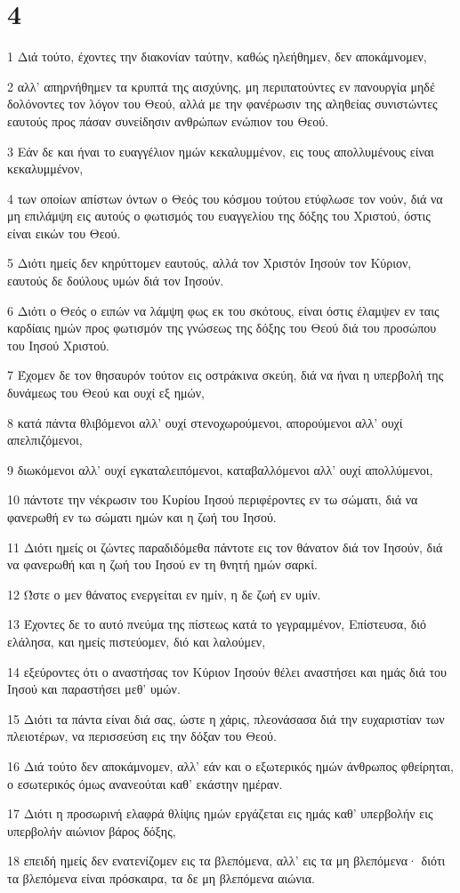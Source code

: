 \chapter{4}

\par 1 Διά τούτο, έχοντες την διακονίαν ταύτην, καθώς ηλεήθημεν, δεν αποκάμνομεν,
\par 2 αλλ' απηρνήθημεν τα κρυπτά της αισχύνης, μη περιπατούντες εν πανουργία μηδέ δολόνοντες τον λόγον του Θεού, αλλά με την φανέρωσιν της αληθείας συνιστώντες εαυτούς προς πάσαν συνείδησιν ανθρώπων ενώπιον του Θεού.
\par 3 Εάν δε και ήναι το ευαγγέλιον ημών κεκαλυμμένον, εις τους απολλυμένους είναι κεκαλυμμένον,
\par 4 των οποίων απίστων όντων ο Θεός του κόσμου τούτου ετύφλωσε τον νούν, διά να μη επιλάμψη εις αυτούς ο φωτισμός του ευαγγελίου της δόξης του Χριστού, όστις είναι εικών του Θεού.
\par 5 Διότι ημείς δεν κηρύττομεν εαυτούς, αλλά τον Χριστόν Ιησούν τον Κύριον, εαυτούς δε δούλους υμών διά τον Ιησούν.
\par 6 Διότι ο Θεός ο ειπών να λάμψη φως εκ του σκότους, είναι όστις έλαμψεν εν ταις καρδίαις ημών προς φωτισμόν της γνώσεως της δόξης του Θεού διά του προσώπου του Ιησού Χριστού.
\par 7 Έχομεν δε τον θησαυρόν τούτον εις οστράκινα σκεύη, διά να ήναι η υπερβολή της δυνάμεως του Θεού και ουχί εξ ημών,
\par 8 κατά πάντα θλιβόμενοι αλλ' ουχί στενοχωρούμενοι, απορούμενοι αλλ' ουχί απελπιζόμενοι,
\par 9 διωκόμενοι αλλ' ουχί εγκαταλειπόμενοι, καταβαλλόμενοι αλλ' ουχί απολλύμενοι,
\par 10 πάντοτε την νέκρωσιν του Κυρίου Ιησού περιφέροντες εν τω σώματι, διά να φανερωθή εν τω σώματι ημών και η ζωή του Ιησού.
\par 11 Διότι ημείς οι ζώντες παραδιδόμεθα πάντοτε εις τον θάνατον διά τον Ιησούν, διά να φανερωθή και η ζωή του Ιησού εν τη θνητή ημών σαρκί.
\par 12 Ώστε ο μεν θάνατος ενεργείται εν ημίν, η δε ζωή εν υμίν.
\par 13 Έχοντες δε το αυτό πνεύμα της πίστεως κατά το γεγραμμένον, Επίστευσα, διό ελάλησα, και ημείς πιστεύομεν, διό και λαλούμεν,
\par 14 εξεύροντες ότι ο αναστήσας τον Κύριον Ιησούν θέλει αναστήσει και ημάς διά του Ιησού και παραστήσει μεθ' υμών.
\par 15 Διότι τα πάντα είναι διά σας, ώστε η χάρις, πλεονάσασα διά την ευχαριστίαν των πλειοτέρων, να περισσεύση εις την δόξαν του Θεού.
\par 16 Διά τούτο δεν αποκάμνομεν, αλλ' εάν και ο εξωτερικός ημών άνθρωπος φθείρηται, ο εσωτερικός όμως ανανεούται καθ' εκάστην ημέραν.
\par 17 Διότι η προσωρινή ελαφρά θλίψις ημών εργάζεται εις ημάς καθ' υπερβολήν εις υπερβολήν αιώνιον βάρος δόξης,
\par 18 επειδή ημείς δεν ενατενίζομεν εις τα βλεπόμενα, αλλ' εις τα μη βλεπόμενα· διότι τα βλεπόμενα είναι πρόσκαιρα, τα δε μη βλεπόμενα αιώνια.

